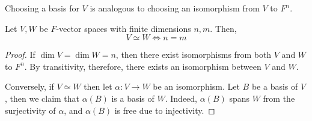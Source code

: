 \begin{remark}
    Choosing a basis for \( V \) is analogous to choosing an isomorphism from \( V \) to \( F^n \).
\end{remark}
\begin{theorem}
    Let \( V, W \) be \( F \)-vector spaces with finite dimensions \( n, m \).
    Then,
    \[ V \simeq W \iff n = m \]
\end{theorem}
\begin{proof}
    If \( \dim V = \dim W = n \), then there exist isomorphisms from both \( V \) and \( W \) to \( F^n \).
    By transitivity, therefore, there exists an isomorphism between \( V \) and \( W \).

    Conversely, if \( V \simeq W \) then let \( \alpha \colon V \to W \) be an isomorphism.
    Let \( B \) be a basis of \( V \), then we claim that \( \alpha(B) \) is a basis of \( W \).
    Indeed, \( \alpha(B) \) spans \( W \) from the surjectivity of \( \alpha \), and \( \alpha(B) \) is free due to injectivity.
\end{proof}

